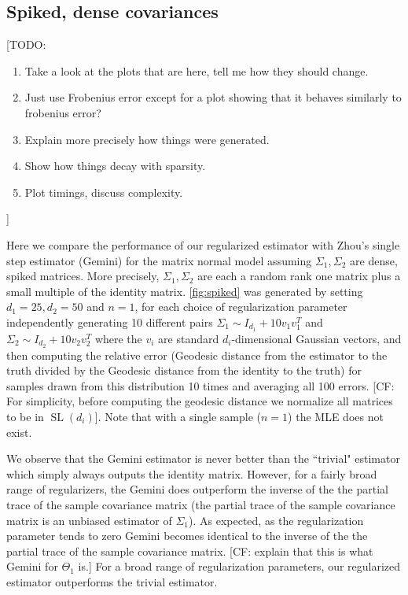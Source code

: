 \documentclass[aos]{imsart}
\theoremstyle{definition}
\numberwithin{equation}{section}
\newcommand{\SL}{\operatorname{SL}}
\newcommand{\CF}[1]{{\color{purple}[CF: #1]}}
\newcommand{\TODO}[1]{{\color{blue}[TODO: #1]}}
\begin{document}
\subsection{Spiked, dense covariances}

\TODO{
\begin{enumerate}
\item Take a look at the plots that are here, tell me how they should change.
\item Just use Frobenius error except for a plot showing that it behaves similarly to frobenius error?
\item Explain more precisely how things were generated.
\item Show how things decay with sparsity.
\item Plot timings, discuss complexity.
\end{enumerate} }

Here we compare the performance of our regularized estimator with Zhou's single step estimator (Gemini) for the matrix normal model assuming $\Sigma_1, \Sigma_2$ are dense, spiked matrices. More precisely, $\Sigma_1, \Sigma_2$ are each a random rank one matrix plus a small multiple of the identity matrix. \cref{fig:spiked} was generated by setting $d_1 = 25, d_2 = 50$ and $n = 1$, for each choice of regularization parameter independently generating 10 different pairs $\Sigma_1 \sim I_{d_1} + 10 v_1v_1^T$ and $\Sigma_2 \sim I_{d_2} + 10 v_2v_2^T$ where the $v_i$ are standard $d_i$-dimensional Gaussian vectors, and then computing the relative error (Geodesic distance from the estimator to the truth divided by the Geodesic distance from the identity to the truth) for samples drawn from this distribution 10 times and averaging all 100 errors. \CF{For simplicity, before computing the geodesic distance we normalize all matrices to be in $\SL(d_i)$}. Note that with a single sample ($n = 1$) the MLE does not exist. 

We observe that the Gemini estimator is never better than the ``trivial" estimator which simply always outputs the identity matrix. However, for a fairly broad range of regularizers, the Gemini does outperform the inverse of the the partial trace of the sample covariance matrix (the partial trace of the sample covariance matrix is an unbiased estimator of $\Sigma_1$). As expected, as the regularization parameter tends to zero Gemini becomes identical to the inverse of the the partial trace of the sample covariance matrix. \CF{explain that this is what Gemini for $\Theta_1$ is.} For a broad range of regularization parameters, our regularized estimator outperforms the trivial estimator.
\end{document}

